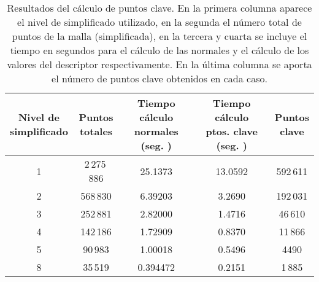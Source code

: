\begin{table}[h!]
	\centering
	\begin{tabular}{| c | c | c | c | c |} 
		\hline
		\thead{Nivel de\\ simplificado} & \thead{Puntos \\ totales}  & \thead{Tiempo cálculo \\normales (seg. )} & \thead{Tiempo cálculo \\ptos. clave (seg. )} & \thead{Puntos \\ clave} \\
		\hline
		1 & 2\,275\,886 & 25.1373 & 13.0592 & 592\,611 \\			 
		2 & 568\,830 & 6.39203  &  3.2690 & 192\,031 \\
		3 & 252\,881 & 2.82000 &  1.4716 & 46\,610 \\
		4 &  142\,186 &  1.72909 &  0.8370 & 11\,866\\
		5 & 90\,983 & 1.00018 & 0.5496 & 4490 \\
		8 & 35\,519 &   0.394472 &   0.2151 &  1\,885\\
		\hline
	\end{tabular}
	\caption{Resultados del cálculo de puntos clave. En la primera columna aparece el nivel de simplificado utilizado, en la segunda el número total de puntos de la malla (simplificada), en la tercera y cuarta se incluye el tiempo en segundos para el cálculo de las normales y el cálculo de los valores del descriptor respectivamente. En la última columna se aporta el número de puntos clave obtenidos en cada caso. }
	\label{table:desNormales}
\end{table}

